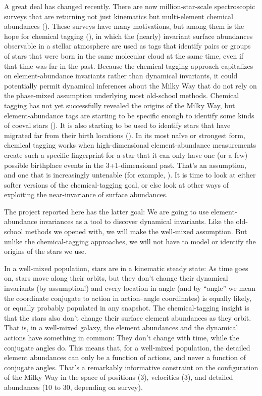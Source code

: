 \documentclass[modern]{aastex62}
\begin{document}
A great deal has changed recently.
There are now million-star-scale spectroscopic surveys that are returning not
just kinematics but multi-element chemical abundances (\citealt{apogee, galah, sdssv}).
These surveys have many motivations, but among them is the hope for
chemical tagging (\citealt{freeman, jbh}), in which the (nearly) invariant surface
abundances observable in a stellar atmosphere are used as tags that identify
pairs or groups of stars that were born in the same molecular cloud at the same time,
even if that time was far in the past.
Because the chemical-tagging approach capitalizes on element-abundance invariants
rather than dynamical invariants, it could potentially permit dynamical inferences
about the Milky Way that do not rely on the phase-mixed assumption underlying
most old-school methods.
Chemical tagging has not yet successfully revealed the origins of
the Milky Way, but element-abundance tags are starting to be specific enough to
identify some kinds of coeval stars (\citealt{tagging}).
It is also starting to be used to identify stars that have
migrated far from their birth locations (\citealt{frankel}).
In its most na\"ive or strongest form, chemical tagging works when high-dimensional
element-abundance measurements create such a specific fingerprint for a star that it
can only have one (or a few) possible birthplace events in the 3+1-dimensional past.
That's an assumption, and one that is increasingly untenable
(for example, \citealt{mitschang, ting, doppel}).
It is time to look at either softer versions of the chemical-tagging goal, or else
look at other ways of exploiting the near-invariance of surface abundances.

The project reported here has the latter goal:
We are going to use element-abundance invariances as a tool to discover dynamical
invariants.
Like the old-school methods we opened with, we will make the well-mixed assumption.
But unlike the chemical-tagging approaches, we will not have to model or identify
the origins of the stars we use.

In a well-mixed population, stars are in a kinematic steady state:
As time goes on, stars move along their orbits, but they don't change their dynamical
invariants (by assumption!) and every location in angle (and by ``angle'' we mean the
coordinate conjugate to action in action--angle coordinates) is equally likely, or
equally probably populated in any snapshot.
The chemical-tagging insight is that the stars also don't change their surface element
abundances as they orbit.
That is, in a well-mixed galaxy, the element abundances and the dynamical actions have
something in common:
They don't change with time, while the conjugate angles do.
This means that, for a well-mixed population, the detailed element abundances can only
be a function of actions, and never a function of conjugate angles.
That's a remarkably informative constraint on the configuration of the Milky Way in
the space of positions (3), velocities (3), and detailed abundances (10 to 30, depending
on survey).
\end{document}
